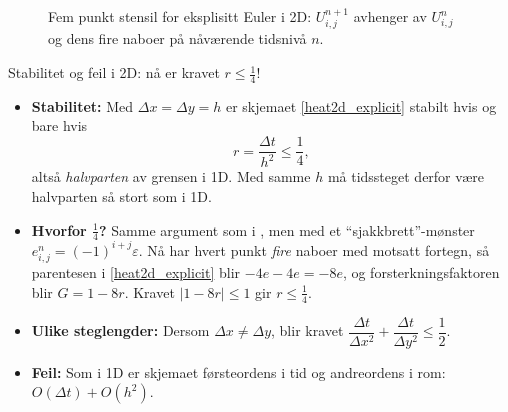 \begin{figure}[htbp] \centering
{}\caption{Fem punkt stensil for eksplisitt Euler i 2D: $U^{n+1}_{i,j}$ avhenger av $U^n_{i,j}$ og dens fire naboer på nåværende tidsnivå $n$.}\label{fd2d_stencil}
\end{figure}

\begin{rem}{Stabilitet og feil i 2D: nå er kravet $r\le\frac14$!}
\begin{itemize}
\item \textbf{Stabilitet:} Med $\Delta x=\Delta y=h$ er skjemaet \eqref{heat2d_explicit} stabilt hvis og bare hvis
\[
r=\frac{\Delta t}{h^2}\le\frac14 ,
\]
altså \emph{halvparten} av grensen i 1D. Med samme $h$ må tidssteget derfor være halvparten så stort som i 1D.
\item \textbf{Hvorfor $\frac14$?} Samme argument som i , men med et ``sjakkbrett''-mønster $e_{i,j}^n=(-1)^{i+j}\varepsilon$. Nå har hvert punkt \emph{fire} naboer med motsatt fortegn, så parentesen i \eqref{heat2d_explicit} blir $-4e-4e=-8e$, og forsterkningsfaktoren blir $G=1-8r$. Kravet $|1-8r|\le1$ gir $r\le\frac14$.
\item \textbf{Ulike steglengder:} Dersom $\Delta x\neq\Delta y$, blir kravet $\dfrac{\Delta t}{\Delta x^2}+\dfrac{\Delta t}{\Delta y^2}\le\dfrac12$.
\item \textbf{Feil:} Som i 1D er skjemaet førsteordens i tid og andreordens i rom: $O(\Delta t)+O(h^2)$.
\end{itemize}
\end{rem}

